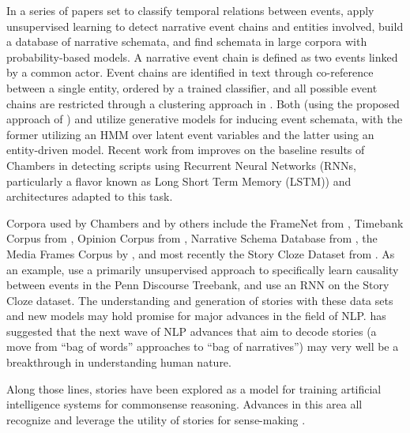 {In a series of papers \cite{chambers2007classifying,chambers2008unsupervised,chambers2009unsupervised,chambers2010database,chambers2013event} set to classify temporal relations between events, apply unsupervised learning to detect narrative event chains and entities involved, build a database of narrative schemata, and find schemata in large corpora with probability-based models.
A narrative event chain is defined as two events linked by a common actor.
Event chains are identified in text through co-reference between a single entity, ordered by a trained classifier, and all possible event chains are restricted through a clustering approach in \cite{chambers2007classifying,chambers2008unsupervised}.
Both \cite{cheung2013probabilistic} (using the proposed approach of \cite{oconnor2013learning}) and \cite{chambers2013event} utilize generative models for inducing event schemata, with the former utilizing an HMM over latent event variables and the latter using an entity-driven model.
Recent work from \cite{pichotta2015learning} improves on the baseline results of Chambers in detecting scripts using Recurrent Neural Networks (RNNs, particularly a flavor known as Long Short Term Memory (LSTM)) and architectures adapted to this task.

Corpora used by Chambers and by others include the FrameNet from \cite{baker1998berkeley}, Timebank Corpus from \cite{pustejovsky2003timebank}, Opinion Corpus from \cite{mani2006machine}, Narrative Schema Database from \cite{chambers2010database}, the Media Frames Corpus by \cite{card2015media}, and most recently the Story Cloze Dataset from \cite{mostafazadeh2016corpus}.
As an example, \cite{do2011minimally} use a primarily unsupervised approach to specifically learn causality between events in the Penn Discourse Treebank, and \cite{roemmele2017an-rnn-based} use an RNN on the Story Cloze dataset.
The understanding and generation of stories with these data sets and new models may hold promise for major advances in the field of NLP.
\cite{cambria2014jumping} has suggested that the next wave of NLP advances that aim to decode stories (a move from ``bag of words'' approaches to ``bag of narratives'') may very well be a breakthrough in understanding human nature.


Along those lines, stories have been explored as a model for training artificial intelligence systems for commonsense reasoning.
Advances in this area all recognize and leverage the utility of stories for sense-making \citep{bex2010persuasive,bex2013values,li2012crowdsourcing,riedl2016computational}.

}
